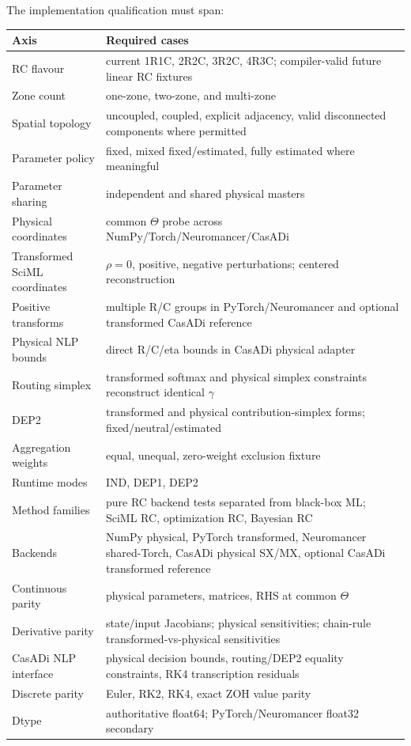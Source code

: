\documentclass[11pt]{article}
\begin{document}
The implementation qualification must span:
\begin{longtable}{p{}p{}}
\toprule
Axis & Required cases\\
\midrule
RC flavour & current 1R1C, 2R2C, 3R2C, 4R3C; compiler-valid future linear RC fixtures\\
Zone count & one-zone, two-zone, and multi-zone\\
Spatial topology & uncoupled, coupled, explicit adjacency, valid disconnected components where permitted\\
Parameter policy & fixed, mixed fixed/estimated, fully estimated where meaningful\\
Parameter sharing & independent and shared physical masters\\
Physical coordinates & common $\Theta$ probe across NumPy/Torch/Neuromancer/CasADi\\
Transformed SciML coordinates & $\rho=0$, positive, negative perturbations; centered reconstruction\\
Positive transforms & multiple R/C groups in PyTorch/Neuromancer and optional transformed CasADi reference\\
Physical NLP bounds & direct R/C/eta bounds in CasADi physical adapter\\
Routing simplex & transformed softmax and physical simplex constraints reconstruct identical $\gamma$\\
DEP2 & transformed and physical contribution-simplex forms; fixed/neutral/estimated\\
Aggregation weights & equal, unequal, zero-weight exclusion fixture\\
Runtime modes & IND, DEP1, DEP2\\
Method families & pure RC backend tests separated from black-box ML; SciML RC, optimization RC, Bayesian RC\\
Backends & NumPy physical, PyTorch transformed, Neuromancer shared-Torch, CasADi physical SX/MX, optional CasADi transformed reference\\
Continuous parity & physical parameters, matrices, RHS at common $\Theta$\\
Derivative parity & state/input Jacobians; physical sensitivities; chain-rule transformed-vs-physical sensitivities\\
CasADi NLP interface & physical decision bounds, routing/DEP2 equality constraints, RK4 transcription residuals\\
Discrete parity & Euler, RK2, RK4, exact ZOH value parity\\
Dtype & authoritative float64; PyTorch/Neuromancer float32 secondary\\
\bottomrule
\end{longtable}
\end{document}
